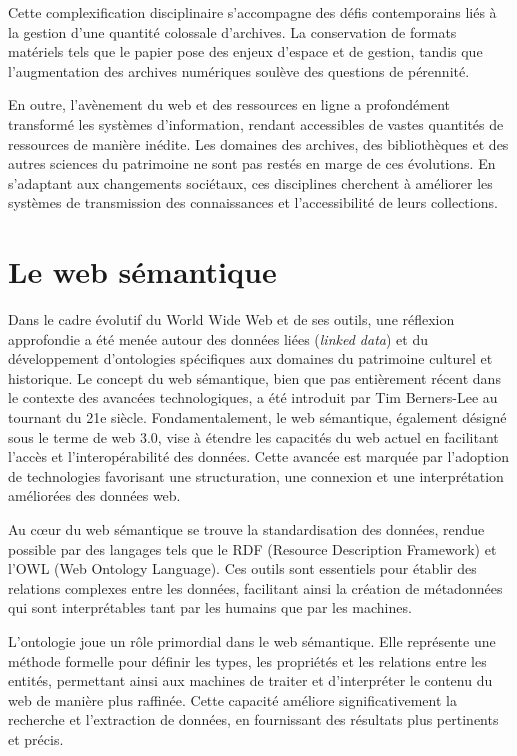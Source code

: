 \documentclass[12pt]{report}
\begin{document}
Cette complexification disciplinaire s'accompagne des défis contemporains liés à la gestion d'une quantité colossale d'archives. La conservation de formats matériels tels que le papier pose des enjeux d'espace et de gestion, tandis que l'augmentation des archives numériques soulève des questions de pérennité.

En outre, l'avènement du web et des ressources en ligne a profondément transformé les systèmes d'information, rendant accessibles de vastes quantités de ressources de manière inédite. Les domaines des archives, des bibliothèques et des autres sciences du patrimoine ne sont pas restés en marge de ces évolutions. En s'adaptant aux changements sociétaux, ces disciplines cherchent à améliorer les systèmes de transmission des connaissances et l'accessibilité de leurs collections.
\section{Le web sémantique}
Dans le cadre évolutif du World Wide Web et de ses outils, une réflexion approfondie a été menée autour des données liées (\textit{linked data}) et du développement d'ontologies spécifiques aux domaines du patrimoine culturel et historique. Le concept du web sémantique, bien que pas entièrement récent dans le contexte des avancées technologiques, a été introduit par Tim Berners-Lee au tournant du 21e siècle. Fondamentalement, le web sémantique, également désigné sous le terme de web 3.0, vise à étendre les capacités du web actuel en facilitant l'accès et l'interopérabilité des données. Cette avancée est marquée par l'adoption de technologies favorisant une structuration, une connexion et une interprétation améliorées des données web.

Au cœur du web sémantique se trouve la standardisation des données, rendue possible par des langages tels que le RDF (Resource Description Framework) et l'OWL (Web Ontology Language). Ces outils sont essentiels pour établir des relations complexes entre les données, facilitant ainsi la création de métadonnées qui sont interprétables tant par les humains que par les machines.

L'ontologie joue un rôle primordial dans le web sémantique. Elle représente une méthode formelle pour définir les types, les propriétés et les relations entre les entités, permettant ainsi aux machines de traiter et d'interpréter le contenu du web de manière plus raffinée. Cette capacité améliore significativement la recherche et l'extraction de données, en fournissant des résultats plus pertinents et précis.
\end{document}
